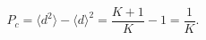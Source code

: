 \begin{equation}
  P_c = \langle d^2 \rangle - \langle d \rangle^2 = \frac{K+1}{K} - 1 = \frac{1}{K}.
\end{equation}





